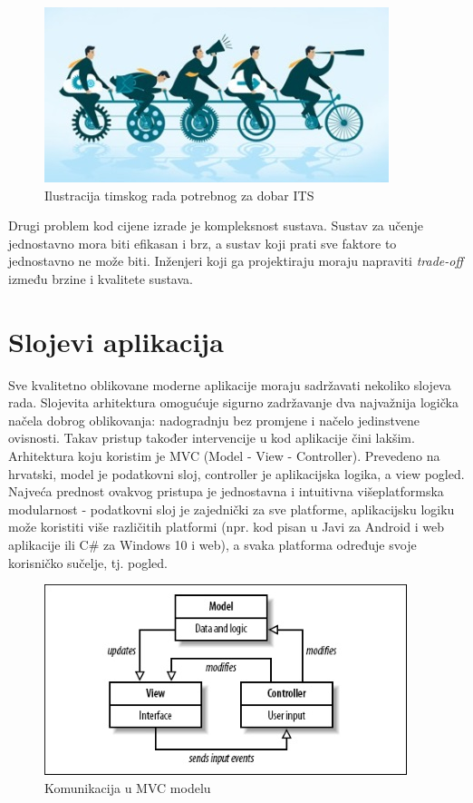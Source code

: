 \documentclass[times, utf8, zavrsni]{fer}
\begin{document}
\begin{figure}[htb]
	\centering
	\includegraphics[]{img/teamwork.jpg}
	\caption{Ilustracija timskog rada potrebnog za dobar ITS}
	\label{fig:teamwork}
\end{figure}

\par
Drugi problem kod cijene izrade je kompleksnost sustava. Sustav za učenje jednostavno mora biti efikasan i brz, a sustav koji prati sve faktore to jednostavno ne može biti. Inženjeri koji ga projektiraju moraju napraviti \textit{trade-off} između brzine i kvalitete sustava.

\chapter{Slojevi aplikacija}
Sve kvalitetno oblikovane moderne aplikacije moraju sadržavati nekoliko slojeva rada. Slojevita arhitektura omogućuje sigurno zadržavanje dva najvažnija logička načela dobrog oblikovanja: nadogradnju bez promjene i načelo jedinstvene ovisnosti. Takav pristup također intervencije u kod aplikacije čini lakšim. Arhitektura koju koristim je MVC (Model - View - Controller). Prevedeno na hrvatski, model je podatkovni sloj, controller je aplikacijska logika, a view pogled. Najveća prednost ovakvog pristupa je jednostavna i intuitivna višeplatformska modularnost - podatkovni sloj je zajednički za sve platforme, aplikacijsku logiku može koristiti više različitih platformi (npr. kod pisan u Javi za Android i web aplikacije ili C\# za Windows 10 i web), a svaka platforma određuje svoje korisničko sučelje, tj. pogled.

\begin{figure}[htb]
	\centering
	\includegraphics[]{img/mvc.jpg}
	\caption{Komunikacija u MVC modelu}
	\label{fig:mvc}
\end{figure}
\end{document}
